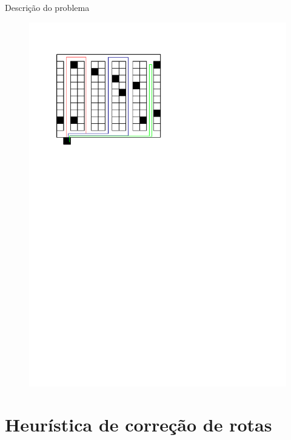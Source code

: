 \documentclass[12pt]{beamer}
\begin{document}
\begin{frame}{Descri\c{c}\~ao do problema}
{\begin{minipage}[t]{0.35\linewidth}
\begin{figure}
				\includegraphics[width=0.9\linewidth]{rota_csprp}				
			\end{figure}
		\end{minipage}
	}
\end{frame}


\section{Heur\'istica de corre\c{c}\~ao de rotas} %
\end{document}
